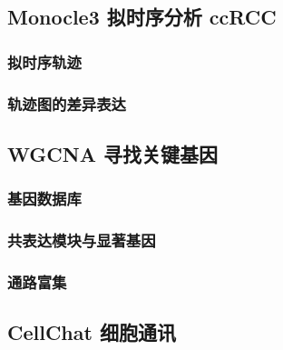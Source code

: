 \documentclass[
]{article}
\begin{document}
\hypertarget{monocle3-ux62dfux65f6ux5e8fux5206ux6790-ccrcc}{%
\subsection{Monocle3 拟时序分析 ccRCC}\label{monocle3-ux62dfux65f6ux5e8fux5206ux6790-ccrcc}}

\hypertarget{ux62dfux65f6ux5e8fux8f68ux8ff9}{%
\subsubsection{拟时序轨迹}\label{ux62dfux65f6ux5e8fux8f68ux8ff9}}

\hypertarget{ux8f68ux8ff9ux56feux7684ux5deeux5f02ux8868ux8fbe}{%
\subsubsection{轨迹图的差异表达}\label{ux8f68ux8ff9ux56feux7684ux5deeux5f02ux8868ux8fbe}}

\hypertarget{wgcna-ux5bfbux627eux5173ux952eux57faux56e0}{%
\subsection{WGCNA 寻找关键基因}\label{wgcna-ux5bfbux627eux5173ux952eux57faux56e0}}

\hypertarget{ux57faux56e0ux6570ux636eux5e93}{%
\subsubsection{基因数据库}\label{ux57faux56e0ux6570ux636eux5e93}}

\hypertarget{ux5171ux8868ux8fbeux6a21ux5757ux4e0eux663eux8457ux57faux56e0}{%
\subsubsection{共表达模块与显著基因}\label{ux5171ux8868ux8fbeux6a21ux5757ux4e0eux663eux8457ux57faux56e0}}

\hypertarget{ux901aux8defux5bccux96c6}{%
\subsubsection{通路富集}\label{ux901aux8defux5bccux96c6}}

\hypertarget{cellchat-ux7ec6ux80deux901aux8baf}{%
\subsection{CellChat 细胞通讯}\label{cellchat-ux7ec6ux80deux901aux8baf}}
\end{document}
